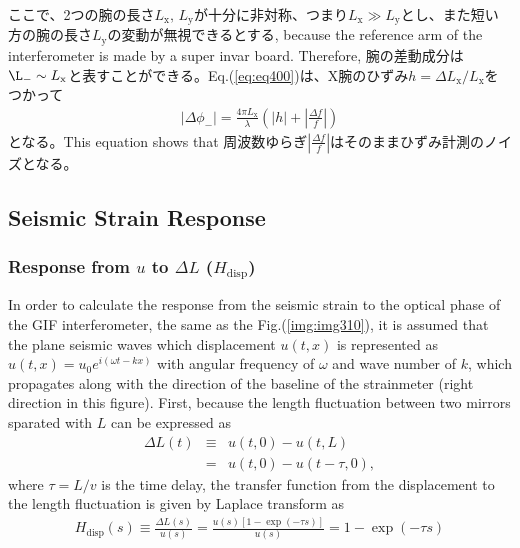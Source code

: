 ここで、2つの腕の長さ$L_{\mathrm{x}},\,L_{\mathrm{y}}$が十分に非対称、つまり$L_{\mathrm{x}} \gg L_{\mathrm{y}}$とし、また短い方の腕の長さ$L_{\mathrm{y}}$の変動が無視できるとする, because the reference arm of the interferometer is made by a super invar board. Therefore, 腕の差動成分は$\L_{-}\sim{L_{\mathrm{x}}}$と表すことができる。Eq.(\ref{eq:eq400})は、X腕のひずみ$h=\Delta{L_{\mathrm{x}}}/L_{\mathrm{x}}$をつかって
\begin{eqnarray}  
  \left|\Delta \phi_{-}\right| = \frac{4\pi{L_{\mathrm{x}}}}{\lambda}\left( \left|h\right|  + \left|\frac{\Delta f}{f}\right|\right) \label{eq:eq400_a}
\end{eqnarray}
となる。This equation shows that 周波数ゆらぎ$|\frac{\Delta{f}}{f}|$はそのままひずみ計測のノイズとなる。

\subsection{Seismic Strain Response}
\subsubsection{Response from $u$ to $\Delta{L}$ ($H_{\mathrm{disp}}$)}
In order to calculate the response from the seismic strain to the optical phase of the GIF interferometer, the same as the Fig.(\ref{img:img310}), it is assumed that the plane seismic waves which displacement $u(t,x)$ is represented as $u(t,x)=u_0e^{i(\omega{t}-kx)}$ with angular frequency of $\omega$ and wave number of $k$, which propagates along with the direction of the baseline of the strainmeter (right direction in this figure). First, because the length fluctuation between two mirrors sparated with $L$ can be expressed as 
\begin{eqnarray} 
  \Delta{L(t)} &\equiv& u(t,0) - u(t,L) \\
  &=& u(t,0) - u(t-\tau,0), \label{eq:eq403}
\end{eqnarray}
where $\tau=L/v$ is the time delay, the transfer function from the displacement to the length fluctuation is given by Laplace transform as
\begin{eqnarray} \label{eq:eq404}
  H_{\mathrm{disp}}(s) \equiv \frac{\Delta{L(s)}}{u(s)} = \frac{u(s)\left[ 1-\exp(-\tau{s}) \right]}{u(s)} = 1 - \exp(-\tau{s})
\end{eqnarray}
